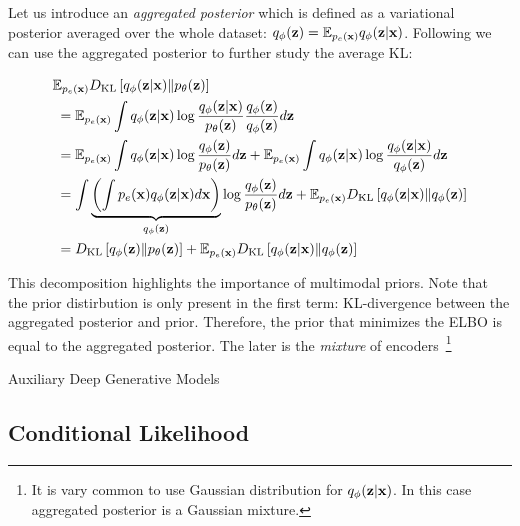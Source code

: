 
Let us introduce an \textit{aggregated posterior} which is defined as a variational posterior averaged over the whole dataset: $q_{\phi}({\mathbf{z}}) = \mathbb{E}_{p_{e}({\mathbf{x}})}q_{\phi}({\mathbf{z}}|{\mathbf{x}})$.
Following \citet{hoffman2016elbo} we can use the aggregated posterior to further study the average KL:

\begin{equation}\label{eq:intro_elbo_vamp}
\begin{aligned}
&\E_{p_e(\rvx)} \KL{q_{\phi}(\rvz|\rvx)}{p_{\theta}(\rvz)} \\
&\; = \E_{p_e(\rvx)} \int q_{\phi}(\rvz|\rvx) \log \frac{q_{\phi}(\rvz|\rvx)}{p_{\theta}(\rvz)}\frac{q_{\phi}(\rvz)}{q_{\phi}(\rvz)}d\rvz \\
&\; = \E_{p_e(\rvx)} \int q_{\phi}(\rvz|\rvx) \log \frac{q_{\phi}(\rvz)}{p_{\theta}(\rvz)}d\rvz
+ \E_{p_e(\rvx)} \int q_{\phi}(\rvz|\rvx) \log \frac{q_{\phi}(\rvz|\rvx)}{q_{\phi}(\rvz)}d\rvz\\
&\; =  \int\underbrace{\left( \int p_{e}(\rvx) q_{\phi}(\rvz|\rvx)d\rvx\right)}_{q_{\phi}(\rvz)} \log \frac{q_{\phi}(\rvz)}{p_{\theta}(\rvz)}d\rvz
+ \E_{p_e(\rvx)} \KL{q_{\phi}(\rvz|\rvx)}{q_{\phi}(\rvz)} \\
&\; =  \KL{q_{\phi}(\rvz)}{p_{\theta}(\rvz)}
+ \E_{p_e(\rvx)} \KL{q_{\phi}(\rvz|\rvx)}{q_{\phi}(\rvz)} \\
\end{aligned}
\end{equation}

This decomposition highlights the importance of multimodal priors. Note that the prior distirbution is only present in the first term: KL-divergence between the aggregated posterior and prior. Therefore, the prior that minimizes the ELBO is equal to the aggregated posterior. The later is the \textit{mixture} of encoders~\footnote{It is vary common to use Gaussian distribution for $q_{\phi}({\mathbf{z}}|{\mathbf{x}})$. In this case aggregated posterior is a Gaussian mixture.}



 

Auxiliary Deep Generative Models \cite{maaloe2016auxiliary}



\subsection{Conditional Likelihood}



